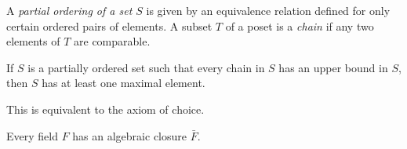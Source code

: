 \begin{definition}[Poset]
    A \emph{partial ordering of a set $S$} is given by an equivalence relation defined for only certain ordered pairs of elements. A subset $T$ of a poset is a \emph{chain} if any two elements of $T$ are comparable.
\end{definition}
\begin{lemma}
    If $S$ is a partially ordered set such that every chain in $S$ has an upper bound in $S$, then $S$ has at least one maximal element.
\end{lemma}
\begin{remark}
    This is equivalent to the axiom of choice.
\end{remark}
\begin{theorem}
    Every field $F$ has an algebraic closure $\bar{F}$.
\end{theorem}
